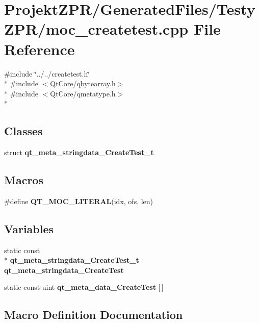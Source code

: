 \section{Projekt\-Z\-P\-R/\-Generated\-Files/\-Testy\-Z\-P\-R/moc\-\_\-createtest.cpp File Reference}
\label{_testy_z_p_r_2moc__createtest_8cpp}
{\ttfamily \#include \char`\"{}../../createtest.\-h\char`\"{}}\\*
{\ttfamily \#include $<$Qt\-Core/qbytearray.\-h$>$}\\*
{\ttfamily \#include $<$Qt\-Core/qmetatype.\-h$>$}\\*
\subsection*{Classes}
\begin{DoxyCompactItemize}
\item 
struct {\bf qt\-\_\-meta\-\_\-stringdata\-\_\-\-Create\-Test\-\_\-t}
\end{DoxyCompactItemize}
\subsection*{Macros}
\begin{DoxyCompactItemize}
\item 
\#define {\bf Q\-T\-\_\-\-M\-O\-C\-\_\-\-L\-I\-T\-E\-R\-A\-L}(idx, ofs, len)
\end{DoxyCompactItemize}
\subsection*{Variables}
\begin{DoxyCompactItemize}
\item 
static const \\*
{\bf qt\-\_\-meta\-\_\-stringdata\-\_\-\-Create\-Test\-\_\-t} {\bf qt\-\_\-meta\-\_\-stringdata\-\_\-\-Create\-Test}
\item 
static const uint {\bf qt\-\_\-meta\-\_\-data\-\_\-\-Create\-Test} [$\,$]
\end{DoxyCompactItemize}


\subsection{Macro Definition Documentation}
